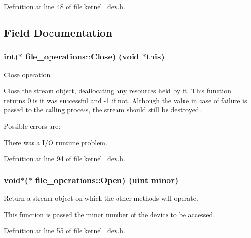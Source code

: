 Definition at line 48 of file kernel\+\_\+dev.\+h.



\subsection{Field Documentation}
\subsubsection[{\texorpdfstring{Close}{Close}}]{\setlength{\rightskip}{0pt plus 5cm}int($\ast$ file\+\_\+operations\+::\+Close) (void $\ast$this)}\hypertarget{structfile__operations_a66cfe706a1a29e3e58c7694dbd801b0f}{}\label{structfile__operations_a66cfe706a1a29e3e58c7694dbd801b0f}


Close operation. 

Close the stream object, deallocating any resources held by it. This function returns 0 is it was successful and -\/1 if not. Although the value in case of failure is passed to the calling process, the stream should still be destroyed.

Possible errors are\+:
\begin{DoxyItemize}
\item There was a I/O runtime problem. 
\end{DoxyItemize}

Definition at line 94 of file kernel\+\_\+dev.\+h.

\subsubsection[{\texorpdfstring{Open}{Open}}]{\setlength{\rightskip}{0pt plus 5cm}void$\ast$($\ast$ file\+\_\+operations\+::\+Open) ({\bf uint} minor)}\hypertarget{structfile__operations_a2732da2af03e1fc7ba0b63a529ab1411}{}\label{structfile__operations_a2732da2af03e1fc7ba0b63a529ab1411}


Return a stream object on which the other methods will operate. 

This function is passed the minor number of the device to be accessed. 

Definition at line 55 of file kernel\+\_\+dev.\+h.

